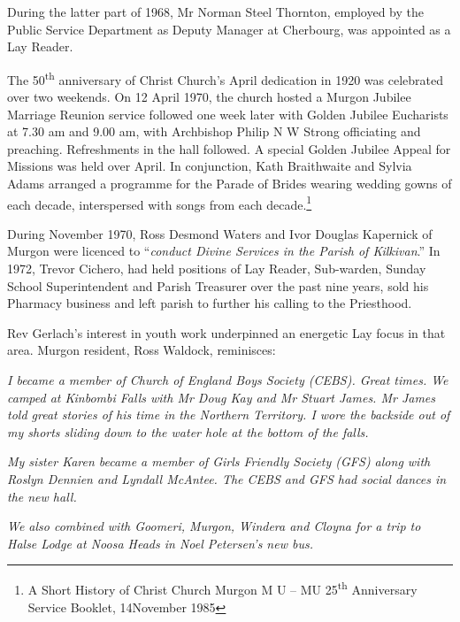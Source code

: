 During the latter part of 1968, Mr Norman Steel Thornton, employed by the Public Service Department as Deputy Manager at Cherbourg, was appointed as a Lay Reader.



The 50\textsuperscript{th} anniversary of Christ Church's April dedication in 1920 was celebrated over two weekends. On 12 April 1970, the church hosted a Murgon Jubilee Marriage Reunion service followed one week later with Golden Jubilee Eucharists at 7.30 am and 9.00 am, with Archbishop Philip N W Strong officiating and preaching. Refreshments in the hall followed. A special Golden Jubilee Appeal for Missions was held over April. In conjunction, Kath Braithwaite and Sylvia Adams arranged a programme for the Parade of Brides wearing wedding gowns of each decade, interspersed with songs from each decade.\footnote{A Short History of Christ Church Murgon M U -- MU 25\textsuperscript{th} Anniversary Service Booklet, 14November 1985}


During November 1970, Ross Desmond Waters and Ivor Douglas Kapernick of Murgon were licenced to ``\emph{conduct Divine Services in the Parish of Kilkivan}.'' In 1972, Trevor Cichero, had held positions of Lay Reader, Sub-warden, Sunday School Superintendent and Parish Treasurer over the past nine years, sold his Pharmacy business and left parish to further his calling to the Priesthood.



Rev Gerlach's interest in youth work underpinned an energetic Lay focus in that area. Murgon resident, Ross Waldock, reminisces:



\emph{I became a member of Church of England Boys Society (CEBS). Great times. We camped at Kinbombi Falls with Mr Doug Kay and Mr Stuart James. Mr James told great stories of his time in the Northern Territory. I wore the backside out of my shorts sliding down to the water hole at the bottom of the falls.}



\smallskip


\emph{My sister Karen became a member of Girls Friendly Society (GFS) along with Roslyn Dennien and Lyndall McAntee. The CEBS and GFS had social dances in the new hall.}



\emph{We also combined with Goomeri, Murgon, Windera and Cloyna for a trip to Halse Lodge at Noosa Heads in Noel Petersen's new bus.}



